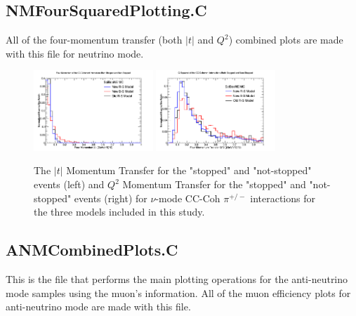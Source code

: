 \documentclass[11pt]{article}
\begin{document}
\subsection{NMFourSquaredPlotting.C}
All of the four-momentum transfer (both $|t|$ and $Q^2$) combined plots are made with this file for neutrino mode.

\begin{figure}[H]
\centering
\includegraphics[width=0.4\textwidth]{CCCohPlots/NMCCCohGoodT.png}
\includegraphics[width=0.4\textwidth]{CCCohPlots/NMCCCohGoodQ2.png}
\caption{The $|t|$ Momentum Transfer for the "stopped" and "not-stopped" events (left) and $Q^2$ Momentum Transfer for the "stopped" and "not-stopped" events (right) for $\nu$-mode CC-Coh $\pi^{+/-}$ interactions for the three models included in this study.}
\end{figure}

\subsection{ANMCombinedPlots.C}
This is the file that performs the main plotting operations for the anti-neutrino mode samples using the muon's information. All of the muon efficiency plots for anti-neutrino mode are made with this file.
\end{document}
